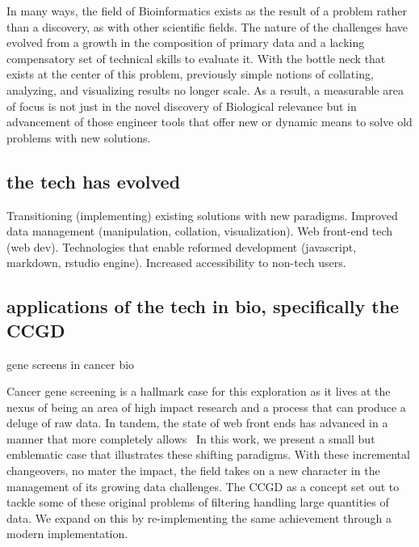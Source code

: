 \documentclass[10pt]{report}
\begin{document}
In many ways, the field of Bioinformatics exists as the result of a problem rather than a discovery, as with other scientific fields. The nature of the challenges have evolved from a growth in the composition of primary data and a lacking compensatory set of technical skills to evaluate it. With the bottle neck that exists at the center of this problem, previously simple notions of collating, analyzing, and visualizing results no longer scale. As a result, a measurable area of focus is not just in the novel discovery of Biological relevance but in advancement of those engineer tools that offer new or dynamic means to solve old problems with new solutions.

\subsection{the tech has evolved}

Transitioning (implementing) existing solutions with new paradigms.  Improved data management (manipulation, collation, visualization).  Web front-end tech (web dev).  Technologies that enable reformed development (javascript, markdown, rstudio engine). Increased accessibility to non-tech users.

\subsection{applications of the tech in bio, specifically the CCGD}
gene screens in cancer bio~\cite{Clark2019}


Cancer gene screening is a hallmark case for this exploration as it lives at the nexus of being an area of high impact research and a process that can produce a deluge of raw data. In tandem, the state of web front ends has advanced in a manner that more completely allows~\cite{10.1093/nar/gkz1161}
In this work, we present a small but emblematic case that illustrates these shifting paradigms. With these incremental changeovers, no mater the impact, the field takes on a new character in the management of its growing data challenges. The CCGD as a concept set out to tackle some of these original problems of filtering handling large quantities of data. We expand on this by re-implementing the same achievement through a modern implementation.



\end{document}

